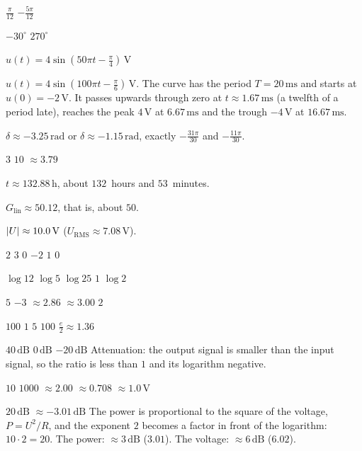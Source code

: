 
\begin{facit}

  $\frac{\pi}{12}$  $-\frac{5\pi}{12}$

  $-30^{\circ}$  $270^{\circ}$

 $u(t) = 4\sin\left(50\pi t - \frac{\pi}{4}\right)\,\text{V}$

 $u(t) = 4\sin\left(100\pi t - \frac{\pi}{6}\right)\,\text{V}$. The curve has the period
$T = 20\,\text{ms}$ and starts at $u(0) = -2\,\text{V}$. It passes upwards through zero at
$t \approx 1.67\,\text{ms}$ (a twelfth of a period late), reaches the peak $4\,\text{V}$ at
$6.67\,\text{ms}$ and the trough $-4\,\text{V}$ at $16.67\,\text{ms}$.

 $\delta \approx -3.25\,\text{rad}$ or $\delta \approx -1.15\,\text{rad}$,
exactly $-\frac{31\pi}{30}$ and $-\frac{11\pi}{30}$.

  $3$  $10$  $\approx 3.79$

 $t \approx 132.88\,\text{h}$, about $132$~hours and $53$~minutes.

 $G_{\text{lin}} \approx 50.12$, that is, about $50$.

 $\lvert U\rvert \approx 10.0\,\text{V}$ ($U_{\text{RMS}} \approx 7.08\,\text{V}$).

  $2$  $3$  $0$  $-2$  $1$  $0$

  $\log 12$  $\log 5$  $\log 25$  $1$  $\log 2$

  $5$  $-3$  $\approx 2.86$  $\approx 3.00$  $2$

  $100$  $1$  $5$  $100$
 $\frac{e}{2} \approx 1.36$

  $40\,\text{dB}$  $0\,\text{dB}$  $-20\,\text{dB}$
 Attenuation: the output signal is smaller than the input signal, so the ratio is less than
$1$ and its logarithm negative.

  $10$  $1000$  $\approx 2.00$  $\approx 0.708$
 $\approx 1.0\,\text{V}$

  $20\,\text{dB}$  $\approx -3.01\,\text{dB}$
 The power is proportional to the square of the voltage, $P = U^2/R$, and the exponent
$2$ becomes a factor in front of the logarithm: $10 \cdot 2 = 20$.
 The power: $\approx 3\,\text{dB}$ ($3.01$). The voltage: $\approx 6\,\text{dB}$ ($6.02$).


\end{facit}
